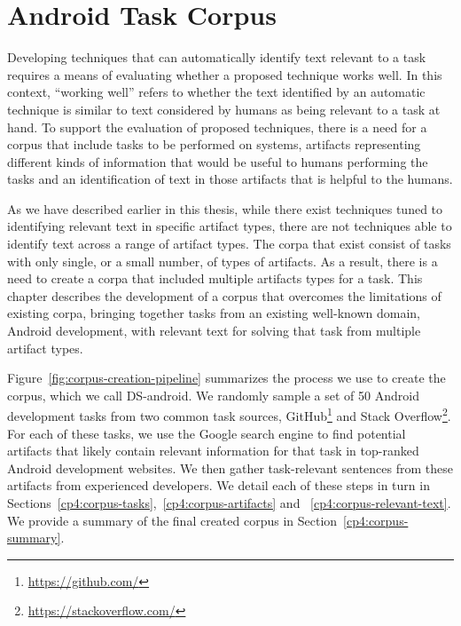 \setcounter{chapter}{3}


\chapter{Android Task Corpus}
\label{ch:android-corpus}



Developing techniques that can automatically identify text
relevant to a task requires a means of evaluating whether
a proposed technique works well. In this context,
``working well'' refers to whether the text identified
by an automatic technique is similar to text considered
by humans as being relevant to a task at hand. To support
the evaluation of proposed techniques, there is a 
need for
a corpus that include tasks to be performed on
systems, artifacts representing different kinds of information
that would be useful to humans performing the tasks
and an identification of text in those artifacts that
is helpful to the humans.

As we have described earlier in this thesis, while there
exist techniques tuned to identifying relevant text in
specific artifact types, there are not techniques able to
identify text across a range of artifact types. The corpa that exist consist of tasks with only single,
or a small number, of types of artifacts. As a result,
there is a need to create a corpa that included
multiple artifacts types for a task. This chapter describes the
development of a corpus that overcomes the limitations of
existing corpa, bringing together tasks from an existing
well-known domain, Android development, with relevant text
for solving that task from multiple artifact types.


Figure~\ref{fig:corpus-creation-pipeline}
summarizes the process we use to create the corpus, which we call \acs{DS-android}.
We randomly sample a set of 50 Android development tasks from two common
task sources, GitHub\footnote{\url{https://github.com/}} and Stack Overflow\footnote{\url{https://stackoverflow.com/}}.
For each of these tasks, we use the Google search engine to find potential artifacts that likely contain relevant
information for that task in top-ranked Android development websites. 
We then gather task-relevant sentences from these artifacts
from experienced developers.
We detail each of these steps in turn in 
Sections~\ref{cp4:corpus-tasks},~\ref{cp4:corpus-artifacts} and ~\ref{cp4:corpus-relevant-text}.
We provide a summary of the final created corpus in Section~\ref{cp4:corpus-summary}.



